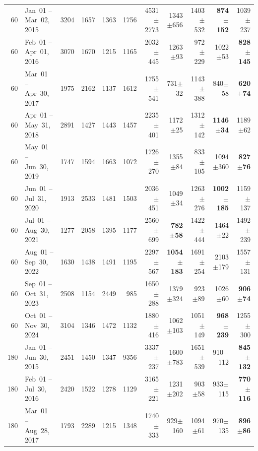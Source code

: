 \begin{longtable}{r l r r r r r r r r r}
60 & Jan~01 -- Mar~02, 2015 & 3204 & 1657 & 1363 & 1756 & 4531{\tiny$\pm$2773} & 1343{\tiny$\pm$656} & 1403{\tiny$\pm$532} & \textbf{874{\tiny$\pm$152}} & 1039{\tiny$\pm$237} \\
60 & Feb~01 -- Apr~01, 2016 & 3070 & 1670 & 1215 & 1165 & 2032{\tiny$\pm$445} & 1263{\tiny$\pm$93} & 972{\tiny$\pm$229} & 1022{\tiny$\pm$53} & \textbf{828{\tiny$\pm$145}} \\
60 & Mar~01 -- Apr~30, 2017 & 1975 & 2162 & 1137 & 1612 & 1755{\tiny$\pm$541} & 731{\tiny$\pm$32} & 1143{\tiny$\pm$388} & 840{\tiny$\pm$58} & \textbf{620{\tiny$\pm$74}} \\
60 & Apr~01 -- May~31, 2018 & 2891 & 1427 & 1443 & 1457 & 2235{\tiny$\pm$401} & 1172{\tiny$\pm$25} & 1312{\tiny$\pm$142} & \textbf{1146{\tiny$\pm$34}} & 1189{\tiny$\pm$62} \\
60 & May~01 -- Jun~30, 2019 & 1747 & 1594 & 1663 & 1072 & 1726{\tiny$\pm$270} & 1355{\tiny$\pm$84} & 833{\tiny$\pm$105} & 1094{\tiny$\pm$360} & \textbf{827{\tiny$\pm$76}} \\
60 & Jun~01 -- Jul~31, 2020 & 1913 & 2533 & 1481 & 1503 & 2036{\tiny$\pm$451} & 1049{\tiny$\pm$34} & 1263{\tiny$\pm$276} & \textbf{1002{\tiny$\pm$185}} & 1159{\tiny$\pm$137} \\
60 & Jul~01 -- Aug~30, 2021 & 1277 & 2058 & 1395 & 1177 & 2560{\tiny$\pm$699} & \textbf{782{\tiny$\pm$58}} & 1422{\tiny$\pm$444} & 1464{\tiny$\pm$22} & 1492{\tiny$\pm$239} \\
60 & Aug~01 -- Sep~30, 2022 & 1630 & 1438 & 1491 & 1195 & 2297{\tiny$\pm$567} & \textbf{1054{\tiny$\pm$183}} & 1691{\tiny$\pm$254} & 2103{\tiny$\pm$179} & 1557{\tiny$\pm$131} \\
60 & Sep~01 -- Oct~31, 2023 & 2508 & 1154 & 2449 & 985 & 1650{\tiny$\pm$288} & 1379{\tiny$\pm$324} & 923{\tiny$\pm$89} & 1026{\tiny$\pm$60} & \textbf{906{\tiny$\pm$74}} \\
60 & Oct~01 -- Nov~30, 2024 & 3104 & 1346 & 1472 & 1132 & 1880{\tiny$\pm$416} & 1062{\tiny$\pm$103} & 1051{\tiny$\pm$149} & \textbf{968{\tiny$\pm$239}} & 1255{\tiny$\pm$300} \\
\midrule
180 & Jan~01 -- Jun~30, 2015 & 2451 & 1450 & 1347 & 9356 & 3337{\tiny$\pm$237} & 1600{\tiny$\pm$783} & 1651{\tiny$\pm$539} & 910{\tiny$\pm$112} & \textbf{845{\tiny$\pm$132}} \\
180 & Feb~01 -- Jul~30, 2016 & 2420 & 1522 & 1278 & 1129 & 3165{\tiny$\pm$221} & 1231{\tiny$\pm$202} & 903{\tiny$\pm$58} & 933{\tiny$\pm$115} & \textbf{770{\tiny$\pm$116}} \\
180 & Mar~01 -- Aug~28, 2017 & 1793 & 2289 & 1215 & 1348 & 1740{\tiny$\pm$333} & 929{\tiny$\pm$160} & 1094{\tiny$\pm$61} & 970{\tiny$\pm$135} & \textbf{896{\tiny$\pm$86}} \\

\end{longtable}
